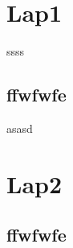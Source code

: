 \documentclass[10pt]{scrbook}
\begin{document}

%
\newpage
{}
\tableofcontents
%
\chapter{Lap1}
ssss

\section{ffwfwfe}
asasd

\chapter{Lap2}
\section{ffwfwfe}



%
%

% 
% 
% 
% 
% 

%



\end{document}
